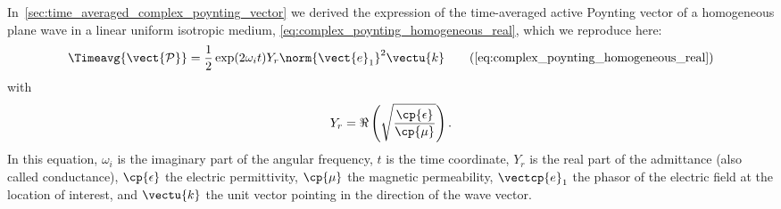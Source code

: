 In~\cref{sec:time_averaged_complex_poynting_vector} we derived the expression of the time-averaged active Poynting vector of a homogeneous plane wave in a linear uniform isotropic medium,
\cref{eq:complex_poynting_homogeneous_real},
which we reproduce here:
\begin{equation}
    \Timeavg{\vect{\mathcal{P}}}
    =
    \frac{1}{2}
    \exp(2\omega_i t)
    Y_r
    \norm{\vect{e}_1}^2
    \vectu{k}
    \tag{\ref{eq:complex_poynting_homogeneous_real}}
\end{equation}
with
\begin{equation}
    Y_r = \Re\left( \sqrt{\frac{\cp{\epsilon}}{\cp{\mu}}} \right)
    \text{.}
\end{equation}
In this equation,
$\omega_i$ is the imaginary part of the angular frequency,
$t$ is the time coordinate,
$Y_r$ is the real part of the admittance (also called conductance),
$\cp{\epsilon}$ the electric permittivity,
$\cp{\mu}$ the magnetic permeability,
$\vectcp{e}_1$ the phasor of the electric field at the location of interest, and
$\vectu{k}$ the unit vector pointing in the direction of the wave vector.

